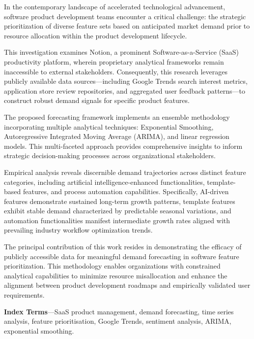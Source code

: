 In the contemporary landscape of accelerated technological advancement, software product development teams encounter a critical challenge: the strategic prioritization of diverse feature sets based on anticipated market demand prior to resource allocation within the product development lifecycle.

This investigation examines Notion, a prominent Software-as-a-Service (SaaS) productivity platform, wherein proprietary analytical frameworks remain inaccessible to external stakeholders. Consequently, this research leverages publicly available data sources—including Google Trends search interest metrics, application store review repositories, and aggregated user feedback patterns—to construct robust demand signals for specific product features.

The proposed forecasting framework implements an ensemble methodology incorporating multiple analytical techniques: Exponential Smoothing, Autoregressive Integrated Moving Average (ARIMA), and linear regression models. This multi-faceted approach provides comprehensive insights to inform strategic decision-making processes across organizational stakeholders.

Empirical analysis reveals discernible demand trajectories across distinct feature categories, including artificial intelligence-enhanced functionalities, template-based features, and process automation capabilities. Specifically, AI-driven features demonstrate sustained long-term growth patterns, template features exhibit stable demand characterized by predictable seasonal variations, and automation functionalities manifest intermediate growth rates aligned with prevailing industry workflow optimization trends.

The principal contribution of this work resides in demonstrating the efficacy of publicly accessible data for meaningful demand forecasting in software feature prioritization. This methodology enables organizations with constrained analytical capabilities to minimize resource misallocation and enhance the alignment between product development roadmaps and empirically validated user requirements.

\textbf{Index Terms}---SaaS product management, demand forecasting, time series analysis, feature prioritisation, Google Trends, sentiment analysis, ARIMA, exponential smoothing.
